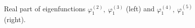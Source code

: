 \documentclass[authoryear]{elsarticle}
\begin{document}
\begin{figure}[!h]
  \begin{center}
\begin{minipage}{0.49\linewidth}
 \\
\end{minipage}
\hfill
\begin{minipage}{0.49\linewidth}
 \\
\end{minipage}
\caption{Real part of eigenfunctions $\varphi^{(2)}_1, \ \varphi^{(3)}_1$ (left) and $\varphi^{(4)}_1, \ \varphi^{(5)}_1$ (right).}
\label{fig:9}
  \end{center}
\end{figure}
\end{document}
